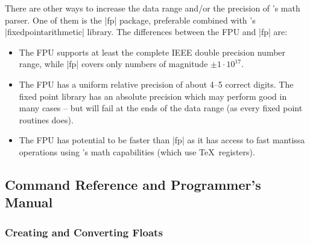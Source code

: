 There are other ways to increase the data range and/or the precision of
\pgfname's math parser. One of them is the |fp| package, preferable combined
with \pgfname's |fixedpointarithmetic| library. The differences between the FPU
and |fp| are:
%
\begin{itemize}
    \item The FPU supports at least the complete IEEE double precision number
        range, while |fp| covers only numbers of magnitude
        $\pm1\cdot 10^{17}$.
    \item The FPU has a uniform relative precision of about 4--5 correct
        digits. The fixed point library has an absolute precision which may
        perform good in many cases -- but will fail at the ends of the data
        range (as every fixed point routines does).
    \item The FPU has potential to be faster than |fp| as it has access to fast
        mantissa operations using \pgfname's math capabilities (which use \TeX\
        registers).
\end{itemize}


\subsection{Command Reference and Programmer's Manual}

\subsubsection{Creating and Converting Floats}

